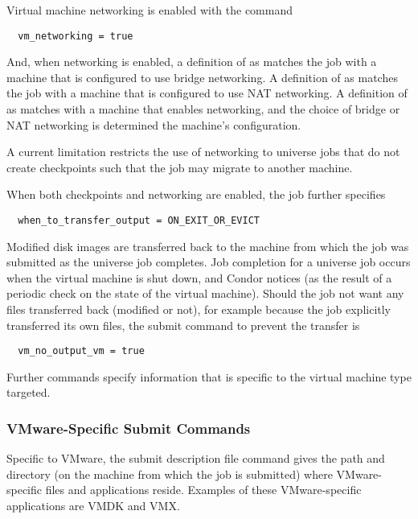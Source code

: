 Virtual machine networking is enabled with the command
\begin{verbatim}
  vm_networking = true
\end{verbatim}
And, when networking is enabled, a definition of
 as 
matches the job with a machine that is configured to use
bridge networking.
A definition of
 as 
matches the job with a machine that is configured to use
NAT networking.
A definition of
 as 
matches with a machine
that enables networking, and the choice of bridge or NAT networking
is determined the machine's configuration.

A current limitation restricts the use of networking to
 universe jobs that do not create checkpoints
such that the job may migrate to another machine.

When both checkpoints and networking are enabled,
the job further specifies
\begin{verbatim}
  when_to_transfer_output = ON_EXIT_OR_EVICT
\end{verbatim}

Modified disk images are transferred back to the machine from which
the job was submitted as the  universe job completes.
Job completion for a  universe job occurs when 
the virtual machine is shut down, and Condor notices 
(as the result of a periodic check on the state of the virtual machine).
Should the job not want any files transferred back (modified or not),
for example because the job explicitly transferred its own files,
the submit command to prevent the transfer is
\begin{verbatim}
  vm_no_output_vm = true
\end{verbatim}

Further commands specify information that is specific to the
virtual machine type targeted.

\subsubsection{\label{sec:vm-VMwaresubmitfile}VMware-Specific Submit Commands}

Specific to VMware, the submit description file command
 gives the path and directory
(on the machine from which the job is submitted)
where VMware-specific files and applications reside.
Examples of these VMware-specific applications are VMDK and VMX.

